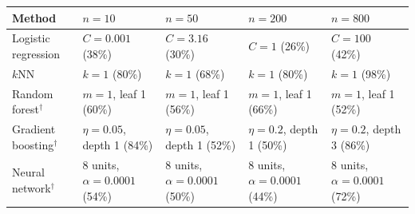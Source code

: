 \begin{tabular}{lllll}
\toprule
Method & $n=10$ & $n=50$ & $n=200$ & $n=800$ \\
\midrule
Logistic regression & $C=0.001$ (38\%) & $C=3.16$ (30\%) & $C=1$ (26\%) & $C=100$ (42\%) \\
$k$NN & $k=1$ (80\%) & $k=1$ (68\%) & $k=1$ (80\%) & $k=1$ (98\%) \\
Random forest$^\dagger$ & $m=1$, leaf 1 (60\%) & $m=1$, leaf 1 (56\%) & $m=1$, leaf 1 (66\%) & $m=1$, leaf 1 (52\%) \\
Gradient boosting$^\dagger$ & $\eta=0.05$, depth 1 (84\%) & $\eta=0.05$, depth 1 (52\%) & $\eta=0.2$, depth 1 (50\%) & $\eta=0.2$, depth 3 (86\%) \\
Neural network$^\dagger$ & 8 units, $\alpha=0.0001$ (54\%) & 8 units, $\alpha=0.0001$ (50\%) & 8 units, $\alpha=0.0001$ (44\%) & 8 units, $\alpha=0.0001$ (72\%) \\
\bottomrule
\end{tabular}
